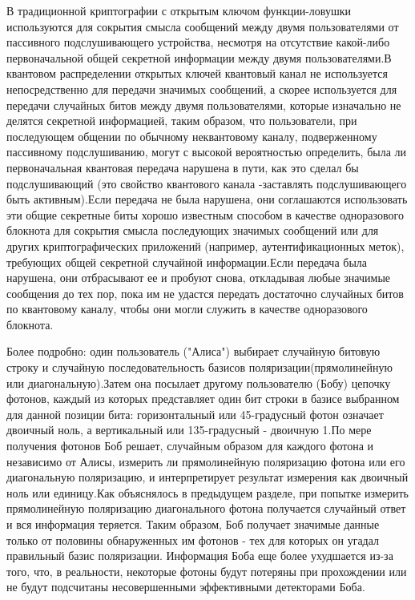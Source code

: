 ­­­­­­­­­­В традиционной криптографии с открытым ключом функции-ловушки используются для сокрытия смысла сообщений между двумя пользователями от пассивного подслушивающего устройства, несмотря на отсутствие какой-либо первоначальной общей секретной информации между двумя пользователями.В квантовом распределении открытых ключей квантовый канал не используется непосредственно для передачи значимых сообщений, а скорее используется для передачи случайных битов между двумя пользователями, которые изначально не делятся секретной информацией, таким образом, что пользователи, при последующем общении по обычному неквантовому каналу, подверженному пассивному подслушиванию, могут с высокой вероятностью определить, была ли первоначальная квантовая передача нарушена в пути, как это сделал бы подслушивающий (это свойство квантового канала -заставлять подслушивающего быть активным).Если передача не была нарушена, они соглашаются использовать эти общие секретные биты хорошо известным способом в качестве одноразового блокнота для сокрытия смысла последующих значимых сообщений или для других криптографических приложений (например, аутентификационных меток), требующих общей секретной случайной информации.Если передача была нарушена, они отбрасывают ее и пробуют снова, откладывая любые значимые сообщения до тех пор, пока им не удастся передать достаточно случайных битов по квантовому каналу, чтобы они могли служить в качестве одноразового блокнота.

­­­­­­­Более подробно: один пользователь ("Алиса") выбирает случайную битовую строку и случайную последовательность базисов поляризации(прямолинейную или диагональную).Затем она посылает другому пользователю (Бобу) цепочку фотонов, каждый из которых представляет один бит строки в базисе выбранном для данной позиции бита: горизонтальный или 45-градусный фотон означает двоичный ноль, а вертикальный или 135-градусный - двоичную 1.По мере получения фотонов Боб решает, случайным образом для каждого фотона и независимо от Алисы, измерить ли прямолинейную поляризацию фотона или его диагональную поляризацию, и интерпретирует результат измерения как двоичный ноль или единицу.Как объяснялось в предыдущем разделе, при попытке измерить прямолинейную поляризацию диагонального фотона получается случайный ответ и вся информация теряется. Таким образом, Боб получает значимые данные только от половины обнаруженных им фотонов - тех для которых он угадал правильный базис поляризации. Информация Боба еще более ухудшается из-за того, что, в реальности, некоторые фотоны будут потеряны при прохождении или не будут подсчитаны несовершенными эффективными детекторами Боба.

